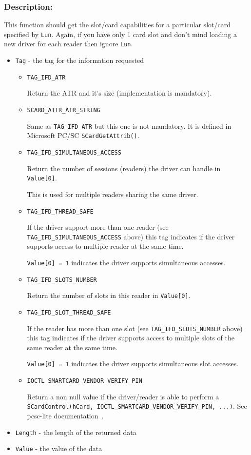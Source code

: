 \documentclass[a4paper,12pt]{article}
\newcommand{\desc}{\subsubsection{Description:}}
\begin{document}
\desc

This function should get the slot/card capabilities for a particular
slot/card specified by \texttt{Lun}. Again, if you have only 1 card slot
and don't mind loading a new driver for each reader then ignore
\texttt{Lun}.

\begin{itemize}
\item \texttt{Tag} - the tag for the information requested

\begin{itemize}
\item \texttt{TAG\_IFD\_ATR}

Return the ATR and it's size (implementation is mandatory).

\item \texttt{SCARD\_ATTR\_ATR\_STRING}

Same as \texttt{TAG\_IFD\_ATR} but this one is not mandatory. It is
defined in Microsoft PC/SC \texttt{SCardGetAttrib()}.

\item \texttt{TAG\_IFD\_SIMULTANEOUS\_ACCESS}

Return the number of sessions (readers) the driver can handle in
\texttt{Value[0]}.

This is used for multiple readers sharing the same driver.

\item \texttt{TAG\_IFD\_THREAD\_SAFE}

If the driver support more than one reader (see
\texttt{TAG\_IFD\_SIMULTANEOUS\_ACCESS} above) this tag indicates if the
driver supports access to multiple reader at the same time.

\texttt{Value[0] = 1} indicates the driver supports simultaneous
accesses.

\item \texttt{TAG\_IFD\_SLOTS\_NUMBER}

Return the number of slots in this reader in \texttt{Value[0]}.

\item \texttt{TAG\_IFD\_SLOT\_THREAD\_SAFE}

If the reader has more than one slot (see
\texttt{TAG\_IFD\_SLOTS\_NUMBER} above) this tag indicates if the driver
supports access to multiple slots of the same reader at the same time.

\texttt{Value[0] = 1} indicates the driver supports simultaneous slot
accesses.

\item \texttt{IOCTL\_SMARTCARD\_VENDOR\_VERIFY\_PIN}

Return a non null value if the driver/reader is able to perform a
\texttt{SCardControl(hCard, IOCTL\_SMARTCARD\_VENDOR\_VERIFY\_PIN,
...)}. See pcsc-lite documentation~\cite{pcsclite}.

\end{itemize}

\item \texttt{Length} - the length of the returned data

\item \texttt{Value} - the value of the data

\end{itemize}
\end{document}
